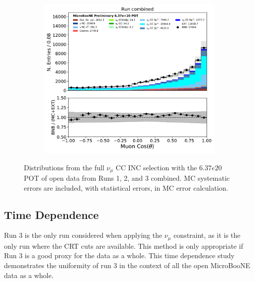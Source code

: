 \begin{figure}[hbt!]
\begin{center}
\begin{subfigure}[b]{0.3\textwidth}
    \caption{\label{fig:NuMUCCsel:ryan:combinedkinematics:muonE}}
    \end{subfigure} %
    \begin{subfigure}[b]{0.3\textwidth}
    \centering
    \includegraphics[width=1.00\textwidth]{NuMuCCsel/Images/Ryan/combined/trk_cos_theta_v_08052020_full_samples_longest_noCRT_event_category.pdf}
    \caption{\label{fig:NuMUCCsel:ryan:combinedkinematics:costheta}}
    \end{subfigure}
\caption{Distributions from the full $\nu_{\mu}$ CC INC selection with the $6.37e20$ POT of open data from Runs 1, 2, and 3 combined. MC systematic errors are included, with statistical errors, in MC error calculation.}
\label{fig:NuMuCCsel:ryan:runscombinedkinematics}
\end{center}
\end{figure}


\subsection{Time Dependence}
\label{ssec:NuMUCCsel:timedep}
\par Run 3 is the only run considered when applying the $\nu_{\mu}$ constraint, as it is the only run where the CRT cuts are available. This method is only appropriate if Run 3 is a good proxy for the data as a whole. This time dependence study demonstrates the uniformity of run 3 in the context of all the open MicroBooNE data as a whole.

